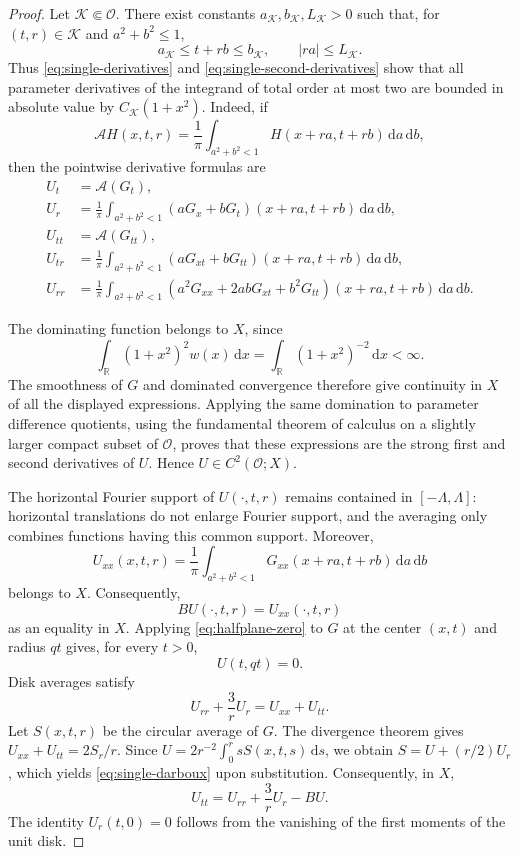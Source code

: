 \documentclass[12pt,a4paper]{article}
\theoremstyle{remark}
\newcommand{\dd}{\,\mathrm d}
\begin{document}
\begin{proof}
Let $\mathcal K\Subset\mathcal O$. There exist constants
$a_{\mathcal K},b_{\mathcal K},L_{\mathcal K}>0$ such that,
for $(t,r)\in\mathcal K$ and $a^2+b^2\le1$,
\[
a_{\mathcal K}\le t+rb\le b_{\mathcal K},
\qquad |ra|\le L_{\mathcal K}.
\]
Thus \eqref{eq:single-derivatives} and
\eqref{eq:single-second-derivatives} show that all parameter
derivatives of the integrand of total order at most two
are bounded in absolute value by $C_{\mathcal K}(1+x^2)$.
Indeed, if
\[
\mathcal A H(x,t,r)
=\frac1\pi\int_{a^2+b^2<1}
H(x+ra,t+rb)\dd a\dd b,
\]
then the pointwise derivative formulas are
\begin{align*}
U_t&=\mathcal A(G_t),\\
U_r&=\frac1\pi\int_{a^2+b^2<1}
       (aG_x+bG_t)(x+ra,t+rb)\dd a\dd b,\\
U_{tt}&=\mathcal A(G_{tt}),\\
U_{tr}&=\frac1\pi\int_{a^2+b^2<1}
       (aG_{xt}+bG_{tt})(x+ra,t+rb)\dd a\dd b,\\
U_{rr}&=\frac1\pi\int_{a^2+b^2<1}
       (a^2G_{xx}+2abG_{xt}+b^2G_{tt})
       (x+ra,t+rb)\dd a\dd b.
\end{align*}

The dominating function belongs to $X$, since
\[
\int_{\mathbb R}(1+x^2)^2w(x)\dd x
=
\int_{\mathbb R}(1+x^2)^{-2}\dd x<\infty.
\]
The smoothness of $G$ and dominated convergence therefore
give continuity in $X$ of all the displayed expressions.
Applying the same domination to parameter difference
quotients, using the fundamental theorem of calculus on
a slightly larger compact subset of $\mathcal O$, proves
that these expressions are the strong first and second
derivatives of $U$. Hence $U\in C^2(\mathcal O;X)$.

The horizontal Fourier support of $U(\cdot,t,r)$ remains
contained in $[-\Lambda,\Lambda]$: horizontal translations
do not enlarge Fourier support, and the averaging only
combines functions having this common support.
Moreover,
\[
U_{xx}(x,t,r)
=\frac1\pi\int_{a^2+b^2<1}
G_{xx}(x+ra,t+rb)\dd a\dd b
\]
belongs to $X$. Consequently,
\[
BU(\cdot,t,r)=U_{xx}(\cdot,t,r)
\]
as an equality in $X$. Applying \eqref{eq:halfplane-zero} to $G$ at the center $(x,t)$ and radius
$qt$ gives, for every $t>0$,
\begin{equation}\label{eq:single-movingboundary}
U(t,qt)=0.
\end{equation}
Disk averages satisfy
\begin{equation}\label{eq:single-darboux}
U_{rr}+\frac3rU_r=U_{xx}+U_{tt}.
\end{equation}
Let $S(x,t,r)$ be the circular average of $G$. The divergence theorem gives
$U_{xx}+U_{tt}=2S_r/r$.
Since $U=2r^{-2}\int_0^r sS(x,t,s)\dd s$, we obtain
$S=U+(r/2)U_r$, which yields \eqref{eq:single-darboux} upon substitution.
Consequently, in $X$,
\begin{equation}\label{eq:single-wave}
U_{tt}=U_{rr}+\frac3rU_r-BU.
\end{equation}
The identity $U_r(t,0)=0$ follows from the vanishing of the first moments of the unit disk.


\end{proof}
\end{document}
